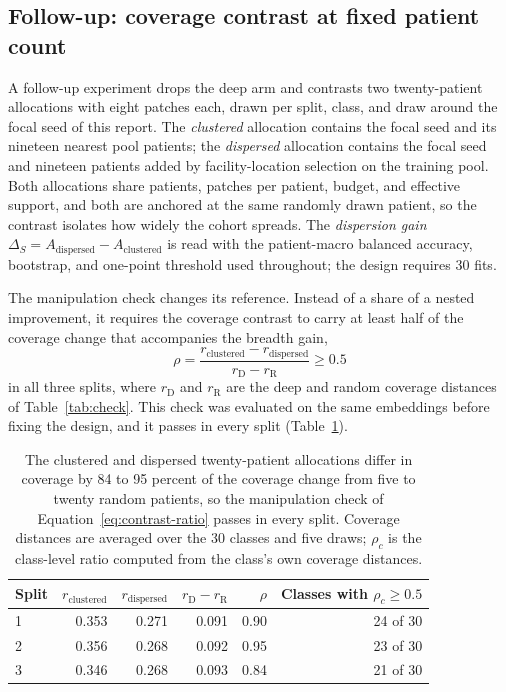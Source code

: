 \subsection{Follow-up: coverage contrast at fixed patient count}
\label{sec:follow-up}
A follow-up experiment drops the deep arm and contrasts two twenty-patient allocations with eight patches each, drawn per split, class, and draw around the focal seed of this report. The \emph{clustered} allocation contains the focal seed and its nineteen nearest pool patients; the \emph{dispersed} allocation contains the focal seed and nineteen patients added by facility-location selection on the training pool. Both allocations share patients, patches per patient, budget, and effective support, and both are anchored at the same randomly drawn patient, so the contrast isolates how widely the cohort spreads. The \emph{dispersion gain} $\Delta_S=A_{\mathrm{dispersed}}-A_{\mathrm{clustered}}$ is read with the patient-macro balanced accuracy, bootstrap, and one-point threshold used throughout; the design requires 30 fits.

The manipulation check changes its reference. Instead of a share of a nested improvement, it requires the coverage contrast to carry at least half of the coverage change that accompanies the breadth gain,
\begin{equation}
 \rho=\frac{r_{\mathrm{clustered}}-r_{\mathrm{dispersed}}}{r_{\mathrm D}-r_{\mathrm R}}\ge 0.5
 \label{eq:contrast-ratio}
\end{equation}
\noindent in all three splits, where $r_{\mathrm D}$ and $r_{\mathrm R}$ are the deep and random coverage distances of Table~\ref{tab:check}. This check was evaluated on the same embeddings before fixing the design, and it passes in every split (Table~\ref{tab:follow-up}).

\begin{table}[htbp]
\centering
\renewcommand{\arraystretch}{1.15}
\begin{tabular}{@{}lrrrrr@{}}
\toprule
Split & $r_{\mathrm{clustered}}$ & $r_{\mathrm{dispersed}}$ & $r_{\mathrm D}-r_{\mathrm R}$ & $\rho$ & Classes with $\rho_c\ge 0.5$ \\
\midrule
1 & 0.353 & 0.271 & 0.091 & 0.90 & 24 of 30 \\
2 & 0.356 & 0.268 & 0.092 & 0.95 & 23 of 30 \\
3 & 0.346 & 0.268 & 0.093 & 0.84 & 21 of 30 \\
\bottomrule
\end{tabular}
\caption{The clustered and dispersed twenty-patient allocations differ in coverage by 84 to 95 percent of the coverage change from five to twenty random patients, so the manipulation check of Equation~\eqref{eq:contrast-ratio} passes in every split. Coverage distances are averaged over the 30 classes and five draws; $\rho_c$ is the class-level ratio computed from the class's own coverage distances.}
\label{tab:follow-up}
\end{table}

